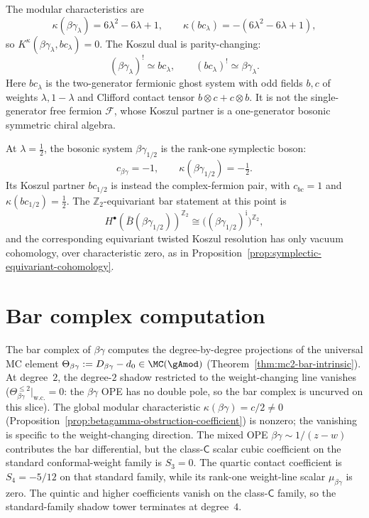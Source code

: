 \begin{proposition}
The modular characteristics are
\begin{equation}\label{eq:betagamma-ledger-kappa}
\kappa(\beta\gamma_\lambda)
=6\lambda^2-6\lambda+1,\qquad
\kappa(bc_\lambda)=-(6\lambda^2-6\lambda+1),
\end{equation}
so \(K^\kappa(\beta\gamma_\lambda,bc_\lambda)=0\).  The Koszul dual
is parity-changing:
\[
(\beta\gamma_\lambda)^!\simeq bc_\lambda,\qquad
(bc_\lambda)^!\simeq\beta\gamma_\lambda .
\]
Here \(bc_\lambda\) is the two-generator fermionic ghost system with
odd fields \(b,c\) of weights \(\lambda,1-\lambda\) and Clifford
contact tensor \(b\otimes c+c\otimes b\).  It is not the
single-generator free fermion \(\mathcal F\), whose Koszul partner is
a one-generator bosonic symmetric chiral algebra.

At \(\lambda=\tfrac12\), the bosonic system
\(\beta\gamma_{1/2}\) is the rank-one symplectic boson:
\[
c_{\beta\gamma}=-1,\qquad \kappa(\beta\gamma_{1/2})=-\tfrac12.
\]
Its Koszul partner \(bc_{1/2}\) is instead the complex-fermion pair,
with \(c_{bc}=1\) and \(\kappa(bc_{1/2})=\tfrac12\).  The
\(\mathbb Z_2\)-equivariant bar statement at this point is
\[
H^\bullet(\bar B(\beta\gamma_{1/2}))^{\mathbb Z_2}
\cong
\bigl((\beta\gamma_{1/2})^{\mathrm i}\bigr)^{\mathbb Z_2},
\]
and the corresponding equivariant twisted Koszul resolution has only
vacuum cohomology, over characteristic zero, as in
Proposition~\ref{prop:symplectic-equivariant-cohomology}.
\end{proposition}

\section{Bar complex computation}

The bar complex of $\beta\gamma$ computes the degree-by-degree
projections of the universal MC element
$\Theta_{\beta\gamma} := D_{\beta\gamma} - d_0 \in \MC(\gAmod)$
(Theorem~\ref{thm:mc2-bar-intrinsic}). At degree~$2$,
the degree-$2$ shadow restricted to the weight-changing line vanishes
($\Theta_{\beta\gamma}^{\leq 2}\big|_{\mathrm{w.c.}} = 0$:
the $\beta\gamma$ OPE has no double pole, so
the bar complex is uncurved on this slice).
The global modular characteristic
$\kappa(\beta\gamma) = c/2 \neq 0$
(Proposition~\ref{prop:betagamma-obstruction-coefficient})
is nonzero; the vanishing is specific to the weight-changing
direction. The mixed OPE $\beta\gamma\sim 1/(z{-}w)$ contributes the
bar differential, but the class-$\mathsf C$ scalar cubic coefficient
on the standard conformal-weight family is $S_3=0$. The quartic
contact coefficient is $S_4=-5/12$ on that standard family, while
its rank-one weight-line scalar $\mu_{\beta\gamma}$ is zero. The
quintic and higher coefficients vanish on the class-$\mathsf C$
family, so the standard-family shadow tower terminates at degree~$4$.

